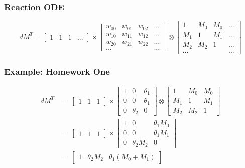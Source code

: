 \documentclass{beamer}
\begin{document}
\begin{frame}
\frametitle{Reaction ODE}
\[
dM^{T}=\left[\begin{array}{cccc}
1 & 1 & 1 & ...\end{array}\right]\times\left[\begin{array}{cccc}
w_{00} & w_{01} & w_{02} & ...\\
w_{10} & w_{11} & w_{12} & ...\\
w_{20} & w_{21} & w_{22} & ...\\
... &  &  & ...
\end{array}\right]\otimes\left[\begin{array}{cccc}
1 & M_{0} & M_{0} & ...\\
M_{1} & 1 & M_{1} & ...\\
M_{2} & M_{2} & 1 & ...\\
... &  &  & ...
\end{array}\right]
\]
\end{frame}

\begin{frame}
\frametitle{Example: Homework One}
\begin{eqnarray*}
dM^{T} & = & \left[\begin{array}{ccc}
1 & 1 & 1\end{array}\right]\times\left[\begin{array}{ccc}
1 & 0 & \theta_{1}\\
0 & 0 & \theta_{1}\\
0 & \theta_{2} & 0
\end{array}\right]\otimes\left[\begin{array}{ccc}
1 & M_{0} & M_{0}\\
M_{1} & 1 & M_{1}\\
M_{2} & M_{2} & 1
\end{array}\right]\\
 & = & \left[\begin{array}{ccc}
1 & 1 & 1\end{array}\right]\times\left[\begin{array}{ccc}
1 & 0 & \theta_{1}M_{0}\\
0 & 0 & \theta_{1}M_{1}\\
0 & \theta_{2}M_{2} & 0
\end{array}\right]\\
 & = & \left[\begin{array}{ccc}
1 & \theta_{2}M_{2} & \theta_{1}\left(M_{0}+M_{1}\right)\end{array}\right]
\end{eqnarray*}
\end{frame}
\end{document}
